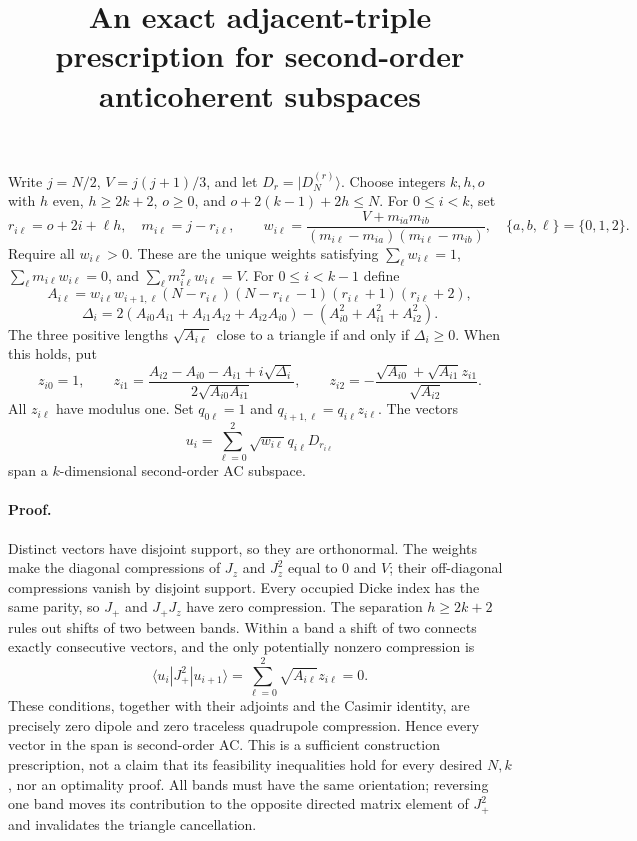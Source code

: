 \documentclass[11pt]{article}
\begin{document}
\title{An exact adjacent-triple prescription for second-order anticoherent subspaces}
\author{}\date{}\maketitle
Write $j=N/2$, $V=j(j+1)/3$, and let $D_r=|D_N^{(r)}\rangle$.
Choose integers $k,h,o$ with $h$ even, $h\ge2k+2$, $o\ge0$, and
$o+2(k-1)+2h\le N$. For $0\le i<k$, set
\[
 r_{i\ell}=o+2i+\ell h,\quad m_{i\ell}=j-r_{i\ell},\qquad
 w_{i\ell}=\frac{V+m_{ia}m_{ib}}{(m_{i\ell}-m_{ia})(m_{i\ell}-m_{ib})},
 \quad\{a,b,\ell\}=\{0,1,2\}.
\]
Require all $w_{i\ell}>0$. These are the unique weights satisfying
$\sum_\ell w_{i\ell}=1$, $\sum_\ell m_{i\ell}w_{i\ell}=0$, and
$\sum_\ell m_{i\ell}^2w_{i\ell}=V$.
For $0\le i<k-1$ define
\[
 A_{i\ell}=w_{i\ell}w_{i+1,\ell}
 (N-r_{i\ell})(N-r_{i\ell}-1)(r_{i\ell}+1)(r_{i\ell}+2),
\]
\[
 \Delta_i=2(A_{i0}A_{i1}+A_{i1}A_{i2}+A_{i2}A_{i0})
 -(A_{i0}^2+A_{i1}^2+A_{i2}^2).
\]
The three positive lengths $\sqrt{A_{i\ell}}$ close to a triangle if and only if
$\Delta_i\ge0$. When this holds, put
\[
 z_{i0}=1,\qquad
 z_{i1}=\frac{A_{i2}-A_{i0}-A_{i1}+i\sqrt{\Delta_i}}
 {2\sqrt{A_{i0}A_{i1}}},\qquad
 z_{i2}=-\frac{\sqrt{A_{i0}}+\sqrt{A_{i1}}z_{i1}}{\sqrt{A_{i2}}}.
\]
All $z_{i\ell}$ have modulus one. Set $q_{0\ell}=1$ and
$q_{i+1,\ell}=q_{i\ell}z_{i\ell}$. The vectors
\[
 u_i=\sum_{\ell=0}^2\sqrt{w_{i\ell}}q_{i\ell}D_{r_{i\ell}}
\]
span a $k$-dimensional second-order AC subspace.

\paragraph{Proof.}
Distinct vectors have disjoint support, so they are orthonormal. The weights
make the diagonal compressions of $J_z$ and $J_z^2$ equal to $0$ and $V$;
their off-diagonal compressions vanish by disjoint support.
Every occupied Dicke index has the same parity, so $J_+$ and $J_+J_z$
have zero compression. The separation $h\ge2k+2$ rules out shifts of two
between bands. Within a band a shift of two connects exactly consecutive
vectors, and the only potentially nonzero compression is
\[
 \langle u_i|J_+^2|u_{i+1}\rangle
 =\sum_{\ell=0}^2\sqrt{A_{i\ell}}z_{i\ell}=0.
\]
These conditions, together with their adjoints and the Casimir identity,
are precisely zero dipole and zero traceless quadrupole compression.
Hence every vector in the span is second-order AC.
This is a sufficient construction prescription, not a claim that its
feasibility inequalities hold for every desired $N,k$, nor an optimality proof.
All bands must have the same orientation; reversing one band moves its
contribution to the opposite directed matrix element of $J_+^2$ and
invalidates the triangle cancellation.
\end{document}
